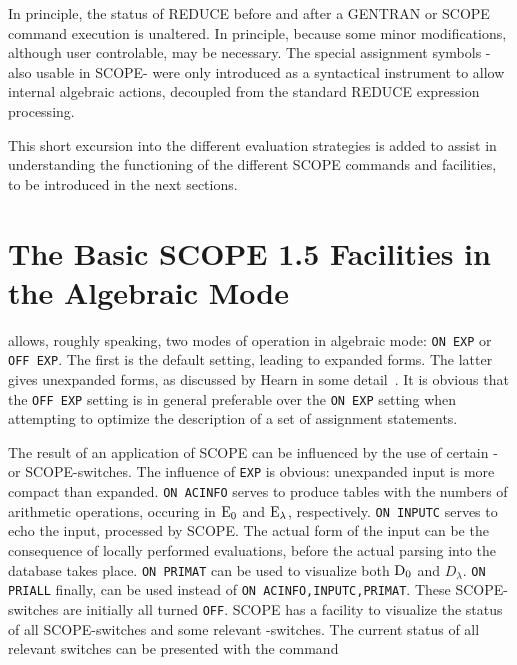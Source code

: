 In principle, the status of REDUCE before and after a GENTRAN or SCOPE
command execution is unaltered. In principle, because some minor modifications,
although user controlable, may be necessary. The special assignment symbols 
 -also usable in SCOPE- were only introduced as a syntactical instrument to 
allow internal algebraic actions, decoupled from the standard REDUCE 
expression processing.

This short excursion into the different evaluation strategies is added to
assist in understanding the functioning of the different SCOPE commands and 
facilities, to be introduced in the next sections.
\newpage

\section{The Basic SCOPE 1.5 Facilities in the Algebraic Mode}\label{SCOPE:basic}

{\REDUCE} allows, roughly speaking, two modes of operation in algebraic
mode: {\tt ON EXP} or {\tt OFF EXP}.  
The first is the default setting, leading to
expanded forms.  The latter gives unexpanded forms, as discussed by Hearn
in some detail~\cite{Hearn:85,Hearn:86}.  It is obvious that the {\tt OFF
EXP} setting is in general preferable over the {\tt ON
EXP} setting when attempting to optimize the description of a set of
assignment statements.


The result of an application of SCOPE can be influenced by the use of
certain {\REDUCE}- or SCOPE-switches. The influence of {\tt EXP} is obvious:
unexpanded input is more compact than expanded.
{\tt ON ACINFO} serves to produce tables with the numbers of arithmetic 
operations, oc\-cu\-ring in ${{{\rm E}}_0}$ and ${{\rm E}}_{\lambda}$, 
respectively.
{\tt ON INPUTC} serves to echo the input, processed by SCOPE. The actual
form of the input can be the consequence of locally performed evaluations, 
before the actual parsing into the database takes place.
{\tt ON  PRIMAT} can be used to visualize 
both ${{\rm D}}_{0}$ and $D_{\lambda}$.  
{\tt ON  PRIALL} finally, can be used instead of
{\tt ON ACINFO,INPUTC,PRIMAT}. These SCOPE-switches are initially all turned
{\tt OFF}. SCOPE has a facility to visualize the status of all
SCOPE-switches and some relevant {\REDUCE}-switches. The current status
of all relevant switches can be presented with the command

